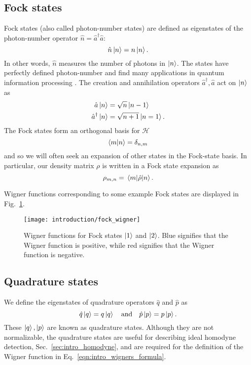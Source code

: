 \subsection{Fock states}
Fock states (also called photon-number states) are defined as eigenstates of the photon-number operator $\hat{n} = \hat{a}^\dagger \hat{a}$:
\begin{equation}
\hat{n} \ket{n} = n \ket{n}.
\end{equation}
In other words, $\hat{n}$ measures the number of photons in $\ket{n}$. The states have perfectly defined photon-number and find many applications in quantum information processing \cite{Bennett1984, Adami1999}. The creation and annihilation operators $\hat{a}^\dagger, \hat{a}$ act on $\ket{n}$ as 
\begin{align*}
\hat{a}\ket{n} &= \sqrt{n}\ket{n-1} \\
\hat{a}^\dagger \ket{n} &= \sqrt{n+1} \ket{n=1}.
\end{align*}
The Fock states form an orthogonal basis for $\mathcal{H}$
\begin{equation}
\ip{m}{n} = \delta_{n, m}
\end{equation}
and so we will often seek an expansion of other states in the Fock-state basis. In particular, our density matrix $\rho$ is written in a Fock state expansion as
\begin{equation}
\rho_{m, n} = \mel{m}{\hat{\rho}}{n}.
\end{equation}

\noindent Wigner functions corresponding to some example Fock states are displayed in Fig.~\ref{fig:intro_fock_wigner}.


\begin{figure}[htp]
\centering
\captionsetup{width=0.8\linewidth}
\texttt{[image: introduction/fock\_wigner]}
\caption{\label{fig:intro_fock_wigner} Wigner functions for Fock states $\ket{1}$ and $\ket{2}$. Blue signifies that the Wigner function is positive, while red signifies that the Wigner function is negative. }
\end{figure}



\FloatBarrier
\subsection{Quadrature states}
We define the eigenstates of quadrature operators $\hat{q}$ and $\hat{p}$ as
\begin{equation}\label{eqn:intro_quadrature_state}
\hat{q}\ket{q} = q \ket{q} \qq{and} \hat{p}\ket{p} = p \ket{p}.
\end{equation}
These $\ket{q}, \ket{p}$ are known as quadrature states. Although they are not normalizable, the quadrature states are useful for describing ideal homodyne detection, Sec.~\ref{sec:intro_homodyne}, and are required for the definition of the Wigner function in Eq.~\ref{eqn:intro_wigners_formula}.



